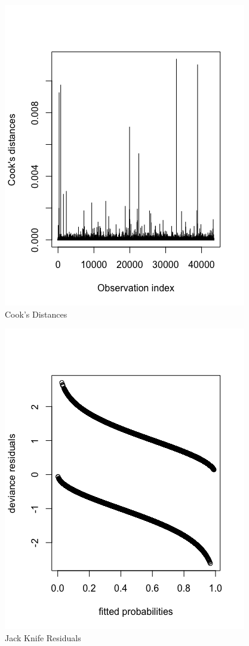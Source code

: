 \documentclass[11pt, oneside]{article}   	%
\begin{document}
  \FloatBarrier
  \begin{figure}[!ht]
    \centering
    \includegraphics[scale=.5]{pp33.png}
    \caption{Cook's Distances}
  \end{figure}
  \FloatBarrier
  \FloatBarrier
  \begin{figure}[!ht]
    \centering
    \includegraphics[scale=.5]{pp11.png}
    \caption{Jack Knife Residuals}
  \end{figure}
  \FloatBarrier
\end{document}
